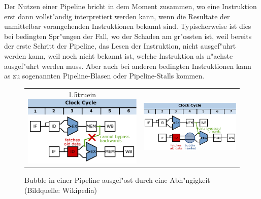 Der Nutzen einer Pipeline bricht in dem Moment zusammen, wo eine Instruktion
erst dann vollst"andig interpretiert werden kann, wenn die Resultate
der unmittelbar vorangehenden Instruktionen bekannt sind.
Typischerweise ist dies bei bedingten Spr"ungen der Fall, wo der
Schaden am gr"ossten ist, weil bereits der erste Schritt der Pipeline,
das Lesen der Instruktion, nicht ausgef"uhrt werden kann, weil noch nicht
bekannt ist, welche Instruktion als n"achste ausgef"uhrt werden muss.
Aber auch bei anderen bedingten Instruktionen kann as zu sogenannten
Pipeline-Blasen oder Pipeline-Stalls kommen.
\begin{figure}
\begin{center}
\begin{tabular}{cc}
\begin{minipage}[b]{0.434\hsize}
\vsize1.5truein
\includegraphics[width=\hsize]{images/pipeline1.pdf}
\end{minipage}&
\begin{minipage}[b]{0.5\hsize}
\includegraphics[width=\hsize]{images/pipeline2.pdf}
\end{minipage}
\end{tabular}
\end{center}
\caption{Bubble in einer Pipeline ausgel"ost durch eine Abh"ngigkeit
(Bildquelle: Wikipedia)
\label{pipelinestall}}
\end{figure}

